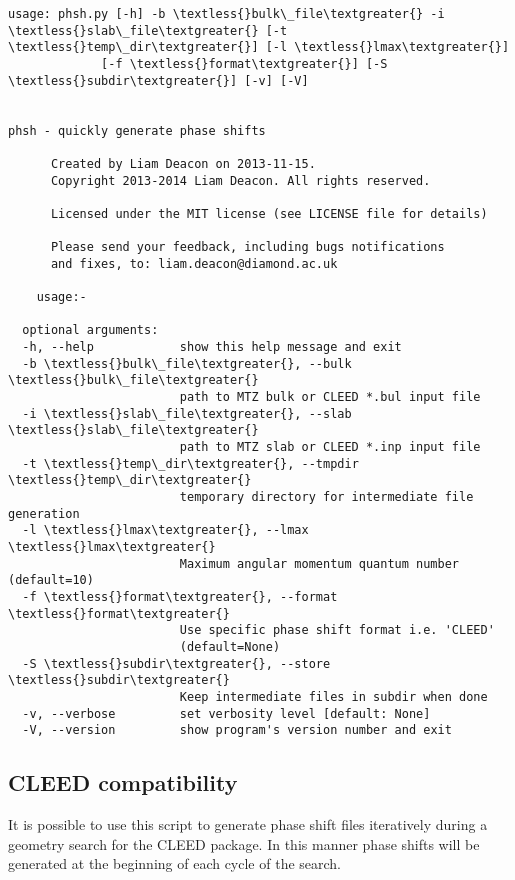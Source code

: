 \documentclass[letterpaper,10pt,english]{sphinxmanual}
\begin{document}
\begin{Verbatim}[commandchars=\\\{\}]
usage: phsh.py [-h] -b \textless{}bulk\_file\textgreater{} -i \textless{}slab\_file\textgreater{} [-t \textless{}temp\_dir\textgreater{}] [-l \textless{}lmax\textgreater{}]
             [-f \textless{}format\textgreater{}] [-S \textless{}subdir\textgreater{}] [-v] [-V]


phsh - quickly generate phase shifts

      Created by Liam Deacon on 2013-11-15.
      Copyright 2013-2014 Liam Deacon. All rights reserved.

      Licensed under the MIT license (see LICENSE file for details)

      Please send your feedback, including bugs notifications
      and fixes, to: liam.deacon@diamond.ac.uk

    usage:-

  optional arguments:
  -h, --help            show this help message and exit
  -b \textless{}bulk\_file\textgreater{}, --bulk \textless{}bulk\_file\textgreater{}
                        path to MTZ bulk or CLEED *.bul input file
  -i \textless{}slab\_file\textgreater{}, --slab \textless{}slab\_file\textgreater{}
                        path to MTZ slab or CLEED *.inp input file
  -t \textless{}temp\_dir\textgreater{}, --tmpdir \textless{}temp\_dir\textgreater{}
                        temporary directory for intermediate file generation
  -l \textless{}lmax\textgreater{}, --lmax \textless{}lmax\textgreater{}
                        Maximum angular momentum quantum number (default=10)
  -f \textless{}format\textgreater{}, --format \textless{}format\textgreater{}
                        Use specific phase shift format i.e. 'CLEED'
                        (default=None)
  -S \textless{}subdir\textgreater{}, --store \textless{}subdir\textgreater{}
                        Keep intermediate files in subdir when done
  -v, --verbose         set verbosity level [default: None]
  -V, --version         show program's version number and exit
\end{Verbatim}


\subsection{CLEED compatibility}
\label{scripts:cleed-compatibility}
It is possible to use this script to generate phase shift files iteratively
during a geometry search for the CLEED package. In this manner phase shifts
will be generated at the beginning of each cycle of the search.
\end{document}
